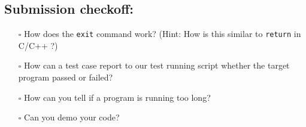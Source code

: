 \documentclass{article}
\begin{document}
\subsection*{Submission checkoff:}
\begin{itemize}
  \item[$\square$] How does the \texttt{exit} command work? (Hint: How is this similar to
    \texttt{return} in C/C++ ?)
  \item[$\square$] How can a test case report to our test running script whether the target program passed or failed?
  \item[$\square$] How can you tell if a program is running too long?
  \item[$\square$] Can you demo your code?
\end{itemize}
\end{document}
